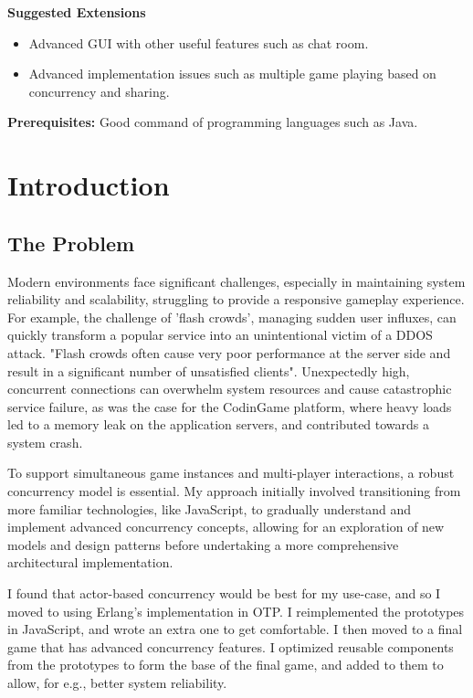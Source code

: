 \documentclass[]{final}
\begin{document}
\textbf{Suggested Extensions}
\begin{itemize}
  \item Advanced GUI with other useful features such as chat room.
  \item Advanced implementation issues such as multiple game playing based on concurrency and sharing.
\end{itemize}

\textbf{Prerequisites:} Good command of programming languages such as Java.


\chapter{Introduction}
\section{The Problem}
Modern environments face significant challenges, especially in maintaining
system reliability and scalability, struggling to provide a responsive gameplay
experience. For example, the challenge of 'flash crowds', managing sudden user influxes,
can quickly transform a popular service into an unintentional victim of a
DDOS attack. "Flash crowds often cause very poor performance
at the server side and result in a significant number of unsatisfied
clients"\cite{Ari_crss_nodate}. Unexpectedly high, concurrent connections can overwhelm
system resources and cause catastrophic service failure, as was the case for
the CodinGame platform, where heavy loads led to a memory leak on the application
servers, and contributed towards a system crash\cite{jobert_story_2017}.

To support simultaneous game instances and multi-player interactions,
a robust concurrency model is essential. My approach initially involved
transitioning from more familiar technologies, like JavaScript, to
gradually understand and implement advanced concurrency concepts,
allowing for an exploration of new models and design patterns before
undertaking a more comprehensive architectural implementation.

I found that actor-based concurrency would be best for my use-case,
and so I moved to using Erlang's implementation in OTP.
I reimplemented the prototypes in JavaScript, and wrote an extra one to
get comfortable. I then moved to a final game that has advanced concurrency
features. I optimized reusable components from the prototypes to form the
base of the final game, and added to them to allow, for e.g., better system
reliability.
\end{document}
